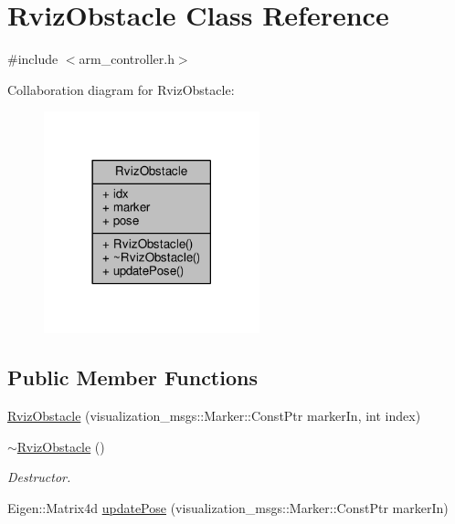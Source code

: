 \hypertarget{class_rviz_obstacle}{}\section{Rviz\+Obstacle Class Reference}
\label{class_rviz_obstacle}


{\ttfamily \#include $<$arm\+\_\+controller.\+h$>$}



Collaboration diagram for Rviz\+Obstacle\+:\nopagebreak
\begin{figure}[H]
\begin{center}
\leavevmode
\includegraphics[width=177pt]{class_rviz_obstacle__coll__graph}
\end{center}
\end{figure}
\subsection*{Public Member Functions}
\begin{DoxyCompactItemize}
\item 
\hyperlink{class_rviz_obstacle_a3fb19f60434581b669c0dc063c026943}{Rviz\+Obstacle} (visualization\+\_\+msgs\+::\+Marker\+::\+Const\+Ptr marker\+In, int index)
\item 
\hyperlink{class_rviz_obstacle_aefa092d8dcad532408308c34cb4cddbe}{$\sim$\+Rviz\+Obstacle} ()
\begin{DoxyCompactList}\small\item\em Destructor. \end{DoxyCompactList}\item 
Eigen\+::\+Matrix4d \hyperlink{class_rviz_obstacle_a30101e2a3c65776bb4abbb139f10b14a}{update\+Pose} (visualization\+\_\+msgs\+::\+Marker\+::\+Const\+Ptr marker\+In)
\end{DoxyCompactItemize}
